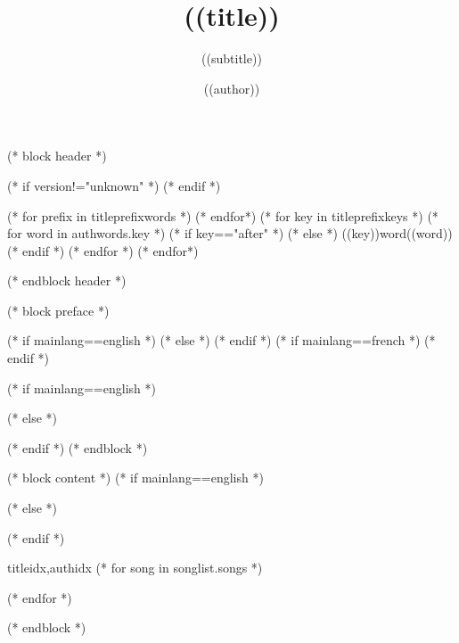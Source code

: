(* block header *)

   \title{((title))}
   \author{((author))}
   \subtitle{((subtitle))}
   (* if version!="unknown" *)
   (* endif *)


   (* for prefix in titleprefixwords *)
   (* endfor*)
   (* for key in titleprefixkeys *)
      (* for word in authwords.key *)
      (* if key=="after" *)
      (* else *)
      \auth((key))word{((word))}
      (* endif *)
      (* endfor *)
   (* endfor*)

   \graphicspath{{((datadir))/img/}}
   \pagestyle{empty}
(* endblock header *)

(* block preface *)

   \renewcommand{\snumbgcolor}{SongNumberBgColor}
   \renewcommand{\notebgcolor}{NoteBgColor}
   \renewcommand{\idxbgcolor}{IndexBgColor}

   (* if mainlang==english *)
   (* else *)
   (* endif *)
   (* if mainlang==french *)
   (* endif *)

   \ifchorded
   (* if mainlang==english *)
   (* else *)
   (* endif *)
   \fi
(* endblock *)

(* block content *)
   (* if mainlang==english *)
   (* else *)
   (* endif *)

   \begin{songs}{titleidx,authidx}
      (* for song in songlist.songs *)
      
      (* endfor *)
   \end{songs}
(* endblock *)
